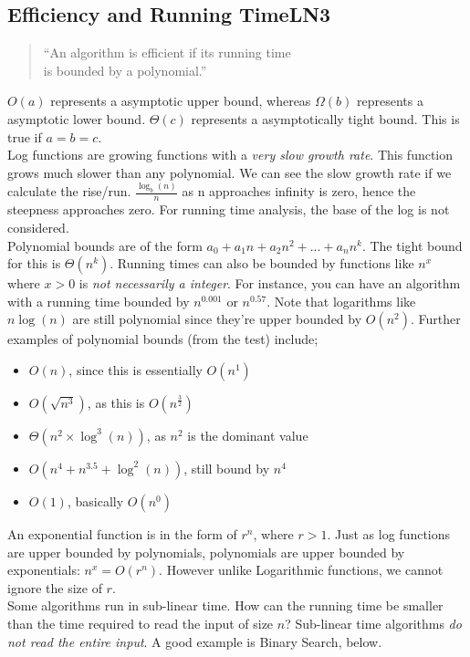 \documentclass[a4paper]{article}
\begin{document}
\begin{tcolorbox}
	\section*{Efficiency and Running Time\hfill{LN3}}
	\begin{quote}
		\centering
		{\Large``An algorithm is efficient if its running time\\ is bounded by a polynomial.''}
	\end{quote}
$O(a)$ represents a asymptotic upper bound, whereas $\Omega(b)$ represents a asymptotic lower bound. $\Theta(c)$ represents a asymptotically tight bound. This is true if $a = b = c$.\\\newline
Log functions are growing functions with a \emph{very slow growth rate}. This function grows much slower than any polynomial. We can see the slow growth rate if we calculate the rise/run. $\frac{\log_b(n)}{n}$ as n approaches infinity is zero, hence the steepness approaches zero. For running time analysis, the base of the log is not considered.\\\newline
Polynomial bounds are of the form $a_0 + a_1n + a_2n^2 + ... + a_nn^k$. The tight bound for this is $\Theta (n^k)$.  Running times can also be bounded by functions like $n^x$ where $x>0$ is \emph{not necessarily a integer}. For instance, you can have an algorithm with a running time bounded by $n^{0.001}$ or $n^{0.57}$. Note that logarithms like $n\log(n)$ are still polynomial since they're upper bounded by $O(n^2)$. Further examples of polynomial bounds (from the test) include;
	\begin{multicols}{2}
		\begin{itemize}
			\item $O(n)$, since this is essentially $O(n^1)$
			\item $O(\sqrt{n^3})$, as this is $O(n^\frac{3}{2})$
			\item $\Theta(n^2\times\log^3(n))$, as $n^2$ is the dominant value
			\item $O(n^4 + n^3.5 + \log^2(n))$, still bound by $n^4$
			\item $O(1)$, basically $O(n^0)$
		\end{itemize}
	\end{multicols}
An exponential function is in the form of $r^n$, where $r > 1$. Just as log functions are upper bounded by polynomials, polynomials are upper bounded by exponentials: $n^x = O(r^n)$. However unlike Logarithmic functions, we cannot ignore the size of $r$.\\\newline
Some algorithms run in sub-linear time. How can the running time be smaller than the time required to read the input of size $n$? Sub-linear time algorithms \emph{do not read the entire input}. A good example is Binary Search, below.
\end{tcolorbox}
\end{document}
